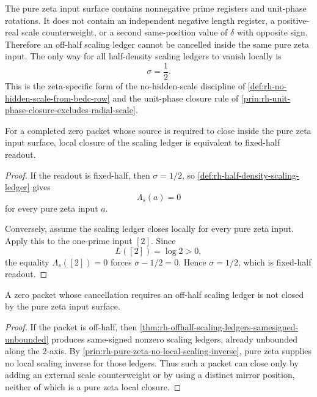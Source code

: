 \begin{principle}
\label{prin:rh-pure-zeta-no-local-scaling-inverse}
The pure zeta input surface contains nonnegative prime registers and
unit-phase rotations.  It does not contain an independent negative
length register, a positive-real scale counterweight, or a second
same-position value of $\delta$ with opposite sign.  Therefore an
off-half scaling ledger cannot be cancelled inside the same pure zeta
input.  The only way for all half-density scaling ledgers to vanish
locally is
$$
\sigma=\frac12.
$$
This is the zeta-specific form of the no-hidden-scale discipline of
\autoref{def:rh-no-hidden-scale-from-bedc-row} and the unit-phase
closure rule of
\autoref{prin:rh-unit-phase-closure-excludes-radial-scale}.
\end{principle}

\begin{theorem}
\label{thm:rh-pure-zeta-local-closure-fixed-half}
For a completed zero packet whose source is required to close inside the
pure zeta input surface, local closure of the scaling ledger is
equivalent to fixed-half readout.
\end{theorem}

\begin{proof}
If the readout is fixed-half, then $\sigma=1/2$, so
\autoref{def:rh-half-density-scaling-ledger} gives
$$
\Lambda_s(a)=0
$$
for every pure zeta input $a$.

Conversely, assume the scaling ledger closes locally for every pure zeta
input.  Apply this to the one-prime input $[2]$.  Since
$$
L([2])=\log2>0,
$$
the equality $\Lambda_s([2])=0$ forces $\sigma-1/2=0$.  Hence
$\sigma=1/2$, which is fixed-half readout.
\end{proof}

\begin{corollary}
\label{cor:rh-scaling-cancellation-zeros-not-pure-zeta-closures}
A zero packet whose cancellation requires an off-half scaling ledger is
not closed by the pure zeta input surface.
\end{corollary}

\begin{proof}
If the packet is off-half, then
\autoref{thm:rh-offhalf-scaling-ledgers-samesigned-unbounded} produces
same-signed nonzero scaling ledgers, already unbounded along the
$2$-axis.  By
\autoref{prin:rh-pure-zeta-no-local-scaling-inverse}, pure zeta supplies
no local scaling inverse for those ledgers.  Thus such a packet can
close only by adding an external scale counterweight or by using a
distinct mirror position, neither of which is a pure zeta local closure.
\end{proof}

